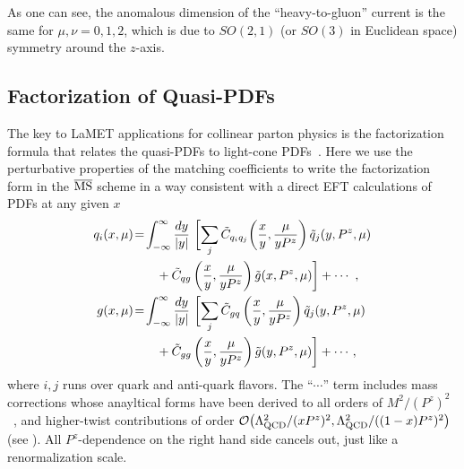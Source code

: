 As one can see, the anomalous dimension of the ``heavy-to-gluon'' current is the same for $\mu,\nu=0,1,2$, which is due to $SO(2,1)$ (or  $SO(3)$ in Euclidean space) symmetry around the $z$-axis.

\subsection{Factorization of Quasi-PDFs}
\label{sec:factorization}


The key to LaMET applications for collinear parton physics
is the factorization formula that relates the quasi-PDFs
to light-cone PDFs~\cite{Ji:2013dva}. Here we use the perturbative properties
of the matching coefficients to write the factorization form
in the ${\overline{\rm MS}}$ scheme in a way consistent with a direct EFT calculations
of PDFs at any given $x$~\cite{Izubuchi:2018srq,Wang:2019tgg}
\begin{align}
	q_i(x,  \mu)\! &=\! \int_{-\infty}^{\infty} \frac{dy}{|y|} \ \bigg[\!\sum_j \tilde C_{q_iq_j}\!\left(\frac{x}{y}, \frac{\mu}{yP^z}\right) \tilde{q}_j(y,P^z,\mu) \label{eq:factorization1} \\
	&\qquad + \tilde C_{qg}\left(\frac{x}{y}, \frac{\mu}{yP^z}\right) \tilde{g}(x,P^z,\mu)\bigg] + \cdots
	\ ,\nn\\
	g(x, \mu)\! &=\! \int_{-\infty}^{\infty} \frac{dy}{|y|} \ \bigg[\!\sum_j \tilde C_{gq}\left(\frac{x}{y}, \frac{\mu}{yP^z}\right) \tilde{q}_j(y,P^z,\mu) \label{eq:factorization2} \\
	&\qquad + \tilde C_{gg}\left(\frac{x}{y}, \frac{\mu}{yP^z}\right) \tilde{g}(y,P^z,\mu)\bigg] + \cdots\,,\nn
\end{align}
where $i,j$ runs over quark and anti-quark flavors.
The ``$\cdots$'' term includes mass corrections whose anayltical forms have been derived to all orders of $M^2/(P^z)^2$~\cite{Chen:2016utp}, and higher-twist contributions of order ${\cal O}\big(\Lambda_{\text{QCD}}^2/ (xP^z)^2,\Lambda_{\text{QCD}}^2/ ((1-x)P^z)^2\big)$ (see ). All $P^z$-dependence on the right hand side
cancels out, just like a renormalization scale.

